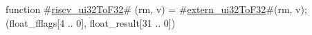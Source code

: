 function #\hyperref[sailRISCVzriscvzyui32ToF32]{riscv\_ui32ToF32}# (rm, v) = {
  #\hyperref[sailRISCVzexternzyui32ToF32]{extern\_ui32ToF32}#(rm, v);
  (float_fflags[4 .. 0], float_result[31 .. 0])
}
